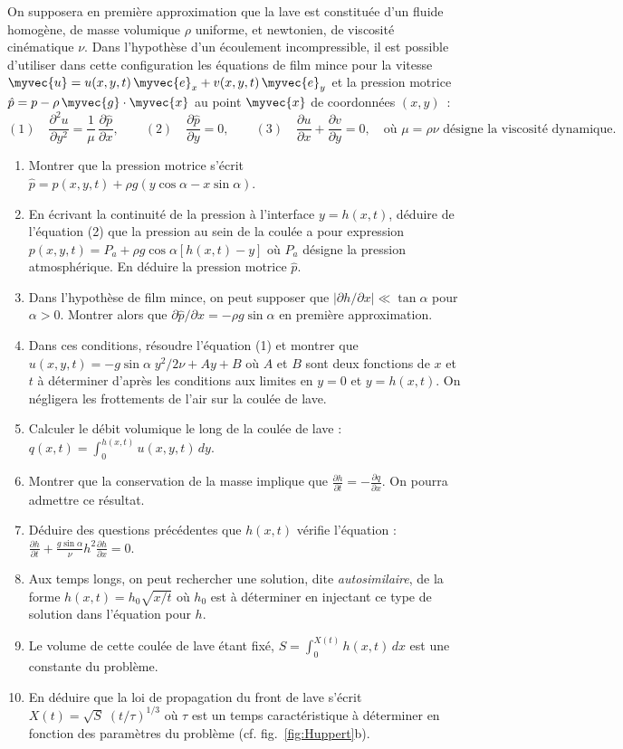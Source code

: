 {\noindent
On supposera en première approximation que la lave est constituée d'un fluide homogène, 
de masse volumique $\rho$ uniforme, et newtonien, de viscosité cinématique $\nu$.
Dans l'hypothèse d'un écoulement incompressible, il est possible d'utiliser dans cette
configuration les équations de film mince pour la vitesse 
$\myvec{u} = u(x, y, t) \, \myvec{e}_x + v(x, y, t) \, \myvec{e}_y$
et la pression motrice $\hat{p} = p - \rho \, \myvec{g}\cdot \myvec{x}$ au point $\myvec{x}$ de coordonnées $(x, y)$~:
\[
	(1)\quad \frac{\partial^2 u}{\partial y^2} = \frac{1}{\mu} \, \frac{\partial \hat{p}}{\partial x},
	\qquad 
	(2)\quad \frac{\partial \hat{p}}{\partial y} = 0,
	\qquad
	(3)\quad \frac{\partial u}{\partial x} + \frac{\partial v}{\partial y} = 0,
	\quad \mbox{où $\mu = \rho \nu$ désigne la viscosité dynamique.}
\]
\begin{enumerate}
\item
	Montrer que la pression motrice s'écrit $\hat{p} = p(x, y, t) + \rho g (y\cos\alpha - x\sin\alpha)$.
\item
	En écrivant la continuité de la pression à l'interface $y=h(x, t)$, déduire de l'équation (2) 	
	que la pression au sein de la coulée a pour expression $p(x, y, t) = P_a + \rho g \cos\alpha\left [h(x, t)-y\right ]$ 
	où $P_a$ désigne la pression atmosphérique.
	En déduire la pression motrice $\hat{p}$.
\item
	Dans l'hypothèse de film mince, on peut supposer que $|\partial h/\partial x| \ll \tan\alpha$ pour $\alpha>0$.
	Montrer alors que $\partial \hat{p} / \partial x = -\rho g \sin\alpha$ en première approximation.
\item
	Dans ces conditions, résoudre l'équation (1) et montrer que $u(x, y, t) = -g\sin\alpha\; y^2/2\nu + A y + B$ où $A$ et $B$ sont
	deux fonctions de $x$ et $t$ à déterminer d'après les conditions aux limites en $y=0$ et $y=h(x, t)$.
	On négligera les frottements de l'air sur la coulée de lave.
\item
	Calculer le débit volumique le long de la coulée de lave : $q(x, t) = \displaystyle \int_0^{h(x, t)} u(x, y, t)\, dy$.
\item
	Montrer que la conservation de la masse implique que $\displaystyle \frac{\partial h}{\partial t} = -\frac{\partial q}{\partial x}$.
	On pourra admettre ce résultat.
\item
	Déduire des questions précédentes que $h(x, t)$ vérifie l'équation : 
	$\displaystyle \frac{\partial h}{\partial t} + \frac{g\sin\alpha}{\nu} h^2 \frac{\partial h}{\partial x} =0$.
\item
	Aux temps longs, on peut rechercher une solution, dite \textit{autosimilaire}, de la forme $h(x, t) = h_0\sqrt{x/t}$
	où $h_0$ est à déterminer en injectant ce type de solution dans l'équation pour $h$.
\item
		Le volume de cette coulée de lave étant fixé, $\displaystyle S = \int_0^{X(t)} h(x, t) \, dx$ est une constante du problème.
\item[]
		En déduire que la loi de propagation du front de lave s'écrit $X(t) = \sqrt{S} \; (t/\tau)^{1/3}$ 
		où $\tau$ est un temps caractéristique à déterminer en fonction des paramètres du problème (cf. fig.~\ref{fig:Huppert}b).	
\end{enumerate}

}
